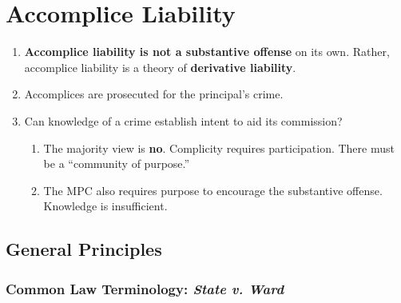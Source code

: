 \section{Accomplice Liability}

\begin{enumerate}
    \item \textbf{Accomplice liability is not a substantive offense} on its 
    own. Rather, accomplice liability is a theory of \textbf{derivative 
    liability}.
    \item Accomplices are prosecuted for the principal's crime.
    \item Can knowledge of a crime establish intent to aid its commission?
    \begin{enumerate}
        \item The majority view is \textbf{no}. Complicity requires 
        participation. There must be a ``community of purpose.''
        \item The MPC also requires purpose to encourage the substantive 
        offense. Knowledge is insufficient.
    \end{enumerate}
\end{enumerate}

\subsection{General Principles}

\subsubsection{Common Law Terminology: \emph{State v. Ward}}

